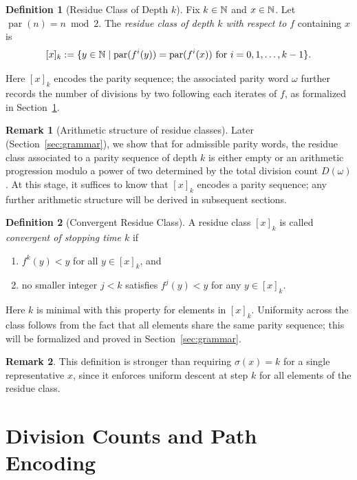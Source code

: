 \documentclass[12pt, oneside]{article}   	%
\numberwithin{equation}{section}          %
\theoremstyle{definition}
\newtheorem{define}{Definition}[section]
\newtheorem*{remark}{Remark}
\begin{document}
\begin{define}[Residue Class of Depth \(k\)]
\label{def:residue-class}
Fix \(k \in \mathbb{N}\) and \(x \in \mathbb{N}\). Let $\operatorname{par}(n)=n\bmod 2$.
The \emph{residue class of depth \(k\) with respect to \(f\)} containing \(x\) is
\[
[x]_k := \{ y \in \mathbb{N} \mid \operatorname{par}(f^i(y)) = \operatorname{par}(f^i(x))
\text{ for } i = 0, 1, \dots, k-1 \}.
\]
\end{define}
Here \([x]_k\) encodes the parity sequence; the associated parity word \(\omega\)
further records the number of divisions by two following each iterates of $f$, as formalized
in Section~\ref{sec:division-counts}.

\begin{remark}[Arithmetic structure of residue classes]
Later (Section~\ref{sec:grammar}), we show that for admissible parity words, the residue class 
associated to a parity sequence of depth $k$ is either empty or an arithmetic progression 
modulo a power of two determined by the total division count $D(\omega)$. At this stage, it 
suffices to know that $[x]_k$ encodes a parity sequence; any further arithmetic structure 
will be derived in subsequent sections.
\end{remark}

\begin{define}[Convergent Residue Class]
A residue class $[x]_k$ is called \emph{convergent of stopping time $k$} if
\begin{enumerate}
\item $f^k(y) < y$ for all $y \in [x]_k$, and
\item no smaller integer $j<k$ satisfies $f^j(y) < y$ for any $y \in [x]_k$.
\end{enumerate}
Here $k$ is minimal with this property for elements in $[x]_k$.  
Uniformity across the class follows from the fact that all elements share the same parity sequence;
this will be formalized and proved in Section~\ref{sec:grammar}.
\end{define}

\begin{remark}
This definition is stronger than requiring \(\sigma(x)=k\) for a single representative
\(x\), since it enforces uniform descent at step \(k\) for all elements of the residue class.
\end{remark}


\newpage
\section{Division Counts and Path Encoding}
\label{sec:division-counts}
\end{document}
